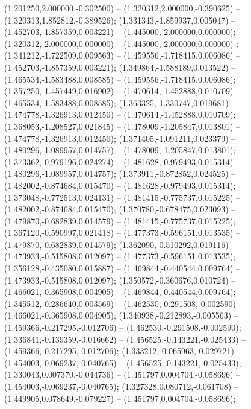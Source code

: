  (1.201250,2.000000,-0.302500) -- (1.320312,2.000000,-0.390625) -- (1.320313,1.852812,-0.389526);
 (1.331343,-1.859937,0.005047) -- (1.452703,-1.857359,0.003221) -- (1.445000,-2.000000,0.000000);
 (1.320312,-2.000000,0.000000) -- (1.445000,-2.000000,0.000000) ;
 (1.341212,-1.722509,0.009563) -- (1.459556,-1.718415,0.006086) -- (1.452703,-1.857359,0.003221);
 (1.349864,-1.588189,0.013522) -- (1.465534,-1.583488,0.008585) -- (1.459556,-1.718415,0.006086);
 (1.357250,-1.457449,0.016902) -- (1.470614,-1.452888,0.010709) -- (1.465534,-1.583488,0.008585);
 (1.363325,-1.330747,0.019681) -- (1.474778,-1.326913,0.012450) -- (1.470614,-1.452888,0.010709);
 (1.368053,-1.208527,0.021845) -- (1.478009,-1.205847,0.013801) -- (1.474778,-1.326913,0.012450);
 (1.371405,-1.091211,0.023379) -- (1.480296,-1.089957,0.014757) -- (1.478009,-1.205847,0.013801);
 (1.373362,-0.979196,0.024274) -- (1.481628,-0.979493,0.015314) -- (1.480296,-1.089957,0.014757);
 (1.373911,-0.872852,0.024525) -- (1.482002,-0.874684,0.015470) -- (1.481628,-0.979493,0.015314);
 (1.373048,-0.772513,0.024131) -- (1.481415,-0.775737,0.015225) -- (1.482002,-0.874684,0.015470);
 (1.370780,-0.678475,0.023093) -- (1.479870,-0.682839,0.014579) -- (1.481415,-0.775737,0.015225);
 (1.367120,-0.590997,0.021418) -- (1.477373,-0.596151,0.013535) -- (1.479870,-0.682839,0.014579);
 (1.362090,-0.510292,0.019116) -- (1.473933,-0.515808,0.012097) -- (1.477373,-0.596151,0.013535);
 (1.356128,-0.435080,0.015887) -- (1.469844,-0.440544,0.009764) -- (1.473933,-0.515808,0.012097);
 (1.350572,-0.360676,0.010724) -- (1.466021,-0.365908,0.004905) -- (1.469844,-0.440544,0.009764);
 (1.345512,-0.286640,0.003569) -- (1.462530,-0.291508,-0.002590) -- (1.466021,-0.365908,0.004905);
 (1.340938,-0.212893,-0.005563) -- (1.459366,-0.217295,-0.012706) -- (1.462530,-0.291508,-0.002590);
 (1.336841,-0.139359,-0.016662) -- (1.456525,-0.143221,-0.025433) -- (1.459366,-0.217295,-0.012706);
 (1.333212,-0.065963,-0.029721) -- (1.454003,-0.069237,-0.040765) -- (1.456525,-0.143221,-0.025433);
 (1.330043,0.007370,-0.044736) -- (1.451797,0.004704,-0.058696) -- (1.454003,-0.069237,-0.040765);
 (1.327328,0.080712,-0.061708) -- (1.449905,0.078649,-0.079227) -- (1.451797,0.004704,-0.058696);
